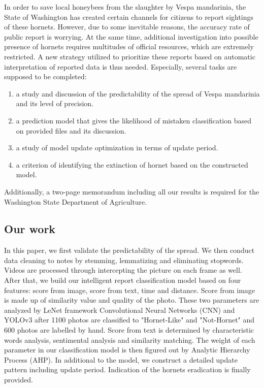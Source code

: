 \documentclass{mcmthesis}
\begin{document}
	In order to save local honeybees from the slaughter by Vespa mandarinia, the State of Washington has created certain channels for citizens to report sightings of these hornets. However, due to some inevitable reasons, the accuracy rate of public report is worrying. At the same time, additional investigation into possible presence of hornets requires  multitudes of official resources, which are extremely restricted. A new strategy utilized to prioritize these reports based on automatic interpretation of reported data is thus needed. Especially, several tasks are supposed to be completed:
	\begin{enumerate}
		\item a study and discussion of the predictability of the spread of Vespa mandarinia and its level of precision.
		\item a prediction model that  gives the likelihood of mistaken classification based on provided files and its discussion.
		\item a study of model update optimization in terms of update period. 
		\item a criterion of identifying the extinction of hornet based on the constructed model.
	\end{enumerate}
		
	Additionally, a two-page memorandum including all our results is required for the Washington State Department of Agriculture.

	\subsection{Our work}
		In this paper, we first validate the predictability of the spread. We then conduct data cleaning  to notes by stemming, lemmatizing and eliminating stopwords. Videos are processed through intercepting the picture on each frame as well. After that, we build our intelligent report classification model  based on four features: score from image, score from text, time and distance. Score from image is made up of similarity value and quality of the photo. These two parameters are analyzed by LeNet framework Convolutional Neural Networks (CNN) and YOLOv3 after 1100 photos are classified to "Hornet-Like" and "Not-Hornet" and 600 photos are labelled by hand. Score from text is determined by characteristic words analysis, sentimental analysis and similarity matching. The weight of each parameter in our classification model is then figured out by Analytic Hierarchy Process (AHP). In additional to the model, we construct a detailed update pattern including update period. Indication of the hornets eradication is finally provided. 
\end{document}
